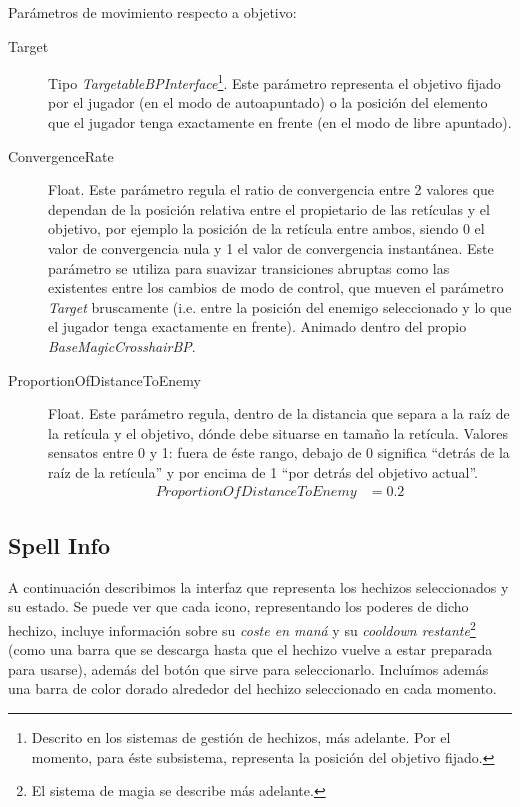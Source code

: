 \documentclass[12pt]{report}
\begin{document}
Parámetros de movimiento respecto a objetivo:

\begin{description}
	\item[Target] Tipo \textit{\emph{TargetableBPInterface}}\footnote{Descrito en los sistemas de gestión de hechizos, más adelante. Por el momento, para éste subsistema, representa la posición del objetivo fijado.}. Este parámetro representa el objetivo fijado por el jugador (en el modo de autoapuntado) o la posición del elemento que el jugador tenga exactamente en frente (en el modo de libre apuntado).
	\item[ConvergenceRate] Float. Este parámetro regula el ratio de convergencia entre 2 valores que dependan de la posición relativa entre el propietario de las retículas y el objetivo, por ejemplo la posición de la retícula entre ambos, siendo 0 el valor de convergencia nula y 1 el valor de convergencia instantánea. Este parámetro se utiliza para suavizar transiciones abruptas como las existentes entre los cambios de modo de control, que mueven el parámetro \textit{Target} bruscamente (i.e. entre la posición del enemigo seleccionado y lo que el jugador tenga exactamente en frente). Animado dentro del propio \textit{\emph{BaseMagicCrosshairBP}}.
	\item[ProportionOfDistanceToEnemy] Float. Este parámetro regula, dentro de la distancia que separa a la raíz de la retícula y el objetivo, dónde debe situarse en tamaño la retícula. Valores sensatos entre 0 y 1: fuera de éste rango, debajo de 0 significa ``detrás de la raíz de la retícula'' y por encima de 1 ``por detrás del objetivo actual''.
    \begin{align}
		ProportionOfDistanceToEnemy &= 0.2
   	\end{align}
\end{description}

\subsection{Spell Info}

A continuación describimos la interfaz que representa los hechizos seleccionados y su estado. Se puede ver que cada icono, representando los poderes de dicho hechizo, incluye información sobre su \textit{coste en maná} y su \textit{cooldown restante}\footnote{El sistema de magia se describe más adelante.} (como una barra que se descarga hasta que el hechizo vuelve a estar preparada para usarse), además del botón que sirve para seleccionarlo. Incluímos además una barra de color dorado alrededor del hechizo seleccionado en cada momento. 
\end{document}

